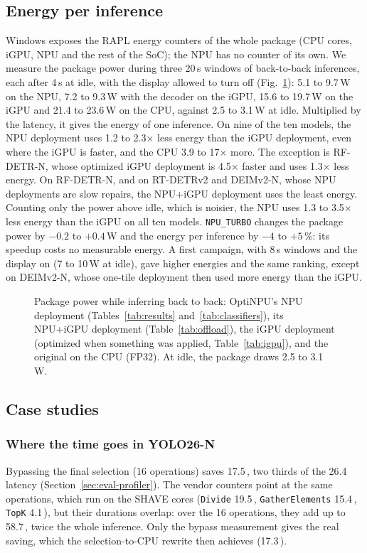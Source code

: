 \documentclass[conference]{IEEEtran}
\newcommand{\tool}{OptiNPU}
\newcommand{\ms}{\,\text{ms}}
\begin{document}
\subsection{Energy per inference}
\label{sec:energy}

Windows exposes the RAPL energy counters of the whole package (CPU cores, iGPU, NPU and the rest of the SoC); the NPU has no counter of its own. We measure the package power during three 20\,s windows of back-to-back inferences, each after 4\,s at idle, with the display allowed to turn off (Fig.~\ref{fig:power}): 5.1 to 9.7\,W on the NPU, 7.2 to 9.3\,W with the decoder on the iGPU, 15.6 to 19.7\,W on the iGPU and 21.4 to 23.6\,W on the CPU, against 2.5 to 3.1\,W at idle. Multiplied by the latency, it gives the energy of one inference. On nine of the ten models, the NPU deployment uses 1.2 to 2.3$\times$ less energy than the iGPU deployment, even where the iGPU is faster, and the CPU 3.9 to 17$\times$ more. The exception is RF-DETR-N, whose optimized iGPU deployment is 4.5$\times$ faster and uses 1.3$\times$ less energy. On RF-DETR-N, and on RT-DETRv2 and DEIMv2-N, whose NPU deployments are slow repairs, the NPU+iGPU deployment uses the least energy. Counting only the power above idle, which is noisier, the NPU uses 1.3 to 3.5$\times$ less energy than the iGPU on all ten models. \texttt{NPU\_TURBO} changes the package power by $-0.2$ to $+0.4$\,W and the energy per inference by $-4$ to $+5\,\%$: its speedup costs no measurable energy. A first campaign, with 8\,s windows and the display on (7 to 10\,W at idle), gave higher energies and the same ranking, except on DEIMv2-N, whose one-tile deployment then used more energy than the iGPU.

\begin{figure}[t]
\centering

\caption{Package power while inferring back to back: \tool{}'s NPU deployment (Tables~\ref{tab:results} and~\ref{tab:classifiers}), its NPU+iGPU deployment (Table~\ref{tab:offload}), the iGPU deployment (optimized when something was applied, Table~\ref{tab:igpu}), and the original on the CPU (FP32). At idle, the package draws 2.5 to 3.1\,W.}
\label{fig:power}
\end{figure}

\subsection{Case studies}
\label{sec:case}

\subsubsection{Where the time goes in YOLO26-N}
Bypassing the final selection (16 operations) saves 17.5\ms{}, two thirds of the 26.4\ms{} latency (Section~\ref{sec:eval-profiler}). The vendor counters point at the same operations, which run on the SHAVE cores (\texttt{Divide} 19.5\ms{}, \texttt{GatherElements} 15.4\ms{}, \texttt{TopK} 4.1\ms{}), but their durations overlap: over the 16 operations, they add up to 58.7\ms{}, twice the whole inference. Only the bypass measurement gives the real saving, which the selection-to-CPU rewrite then achieves (17.3\ms{}).
\end{document}
